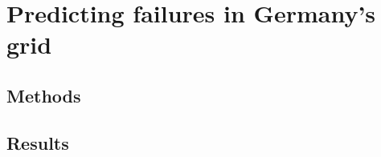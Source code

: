 \documentclass{report}
\theoremstyle{definition}
\theoremstyle{remark}
\begin{document}
\part{Predicting failures in Germany's grid}\label{part:sim}

\chapter{Methods}\label{chap:methods}


\chapter{Results}\label{chap:results}





%
%




\printindex
\end{document}
